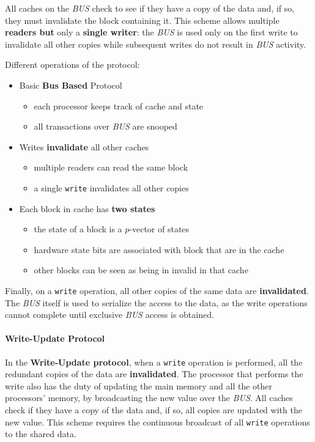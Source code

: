 \documentclass[english]{article}
\begin{document}
All caches on the \textit{BUS} check to see if they have a copy of the data and, if so, they must invalidate the block containing it.
This scheme allows multiple \textbf{readers but} only a \textbf{single writer}: the \textit{BUS} is used only on the first write to invalidate all other copies while subsequent writes do not result in \textit{BUS} activity.

\bigskip
Different operations of the protocol:

\begin{itemize}
  \item Basic \textbf{Bus Based} Protocol
        \begin{itemize}
          \item each processor keeps track of cache and state
          \item all transactions over \textit{BUS} are snooped
        \end{itemize}
  \item Writes \textbf{invalidate} all other caches
        \begin{itemize}
          \item multiple readers can read the same block
          \item a single \texttt{write} invalidates all other copies
        \end{itemize}
  \item Each block in cache has \textbf{two states}
        \begin{itemize}
          \item the state of a block is a \(p\)-vector of states
          \item hardware state bits are associated with block that are in the cache
          \item other blocks can be seen as being in invalid in that cache
        \end{itemize}
\end{itemize}

Finally, on a \texttt{write} operation, all other copies of the same data are \textbf{invalidated}.
The \textit{BUS} itself is used to serialize the access to the data, as the write operations cannot complete until exclusive \textit{BUS} access is obtained.

\paragraph{Write-Update Protocol}

In the \textbf{Write-Update protocol}, when a \texttt{write} operation is performed, all the redundant copies of the data are \textbf{invalidated}.
The processor that performs the write also has the duty of updating the main memory and all the other processors' memory, by broadcasting the new value over the \textit{BUS}.
All caches check if they have a copy of the data and, if so, all copies are updated with the new value.
This scheme requires the continuous broadcast of all \texttt{write} operations to the shared data.
\end{document}
